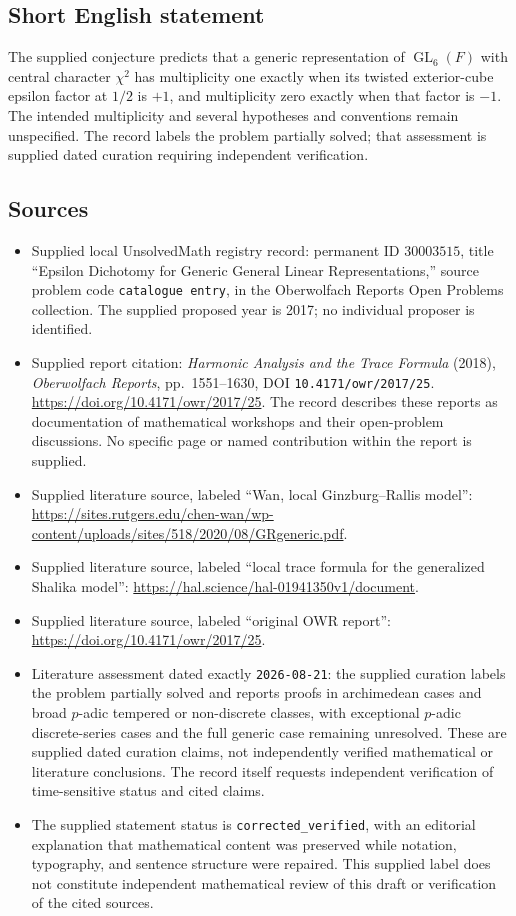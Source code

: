 \documentclass[11pt]{article}
\begin{document}
\subsection{Short English statement}
The supplied conjecture predicts that a generic representation of \(\operatorname{GL}_6(F)\) with central character \(\chi^2\) has multiplicity one exactly when its twisted exterior-cube epsilon factor at \(1/2\) is \(+1\), and multiplicity zero exactly when that factor is \(-1\). The intended multiplicity and several hypotheses and conventions remain unspecified. The record labels the problem partially solved; that assessment is supplied dated curation requiring independent verification.
\subsection{Sources}
\begin{itemize}
\item Supplied local UnsolvedMath registry record: permanent ID \(30003515\), title ``Epsilon Dichotomy for Generic General Linear Representations,'' source problem code \texttt{catalogue entry}, in the Oberwolfach Reports Open Problems collection. The supplied proposed year is 2017; no individual proposer is identified.
\item Supplied report citation: \emph{Harmonic Analysis and the Trace Formula} (2018), \emph{Oberwolfach Reports}, pp.\ 1551--1630, DOI \texttt{10.4171/owr/2017/25}. \url{https://doi.org/10.4171/owr/2017/25}. The record describes these reports as documentation of mathematical workshops and their open-problem discussions. No specific page or named contribution within the report is supplied.
\item Supplied literature source, labeled ``Wan, local Ginzburg--Rallis model'': \url{https://sites.rutgers.edu/chen-wan/wp-content/uploads/sites/518/2020/08/GRgeneric.pdf}.
\item Supplied literature source, labeled ``local trace formula for the generalized Shalika model'': \url{https://hal.science/hal-01941350v1/document}.
\item Supplied literature source, labeled ``original OWR report'': \url{https://doi.org/10.4171/owr/2017/25}.
\item Literature assessment dated exactly \texttt{2026-08-21}: the supplied curation labels the problem partially solved and reports proofs in archimedean cases and broad \(p\)-adic tempered or non-discrete classes, with exceptional \(p\)-adic discrete-series cases and the full generic case remaining unresolved. These are supplied dated curation claims, not independently verified mathematical or literature conclusions. The record itself requests independent verification of time-sensitive status and cited claims.
\item The supplied statement status is \texttt{corrected\_verified}, with an editorial explanation that mathematical content was preserved while notation, typography, and sentence structure were repaired. This supplied label does not constitute independent mathematical review of this draft or verification of the cited sources.
\end{itemize}
\end{document}
